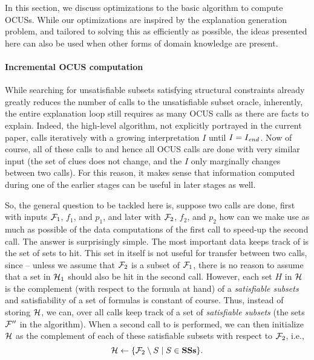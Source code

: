 In this section, we discuss optimizations to the basic algorithm to compute OCUSs. 
While our optimizations are inspired by the explanation generation problem, and tailored to solving this as efficiently as possible, the ideas presented here can also be used when other forms of domain knowledge are present.  


\paragraph{Incremental OCUS computation}
While searching for unsatisfiable subsets satisfying structural constraints already greatly reduces the number of calls to the unsatisfiable subset oracle, inherently, the entire explanation loop still requires as many OCUS calls as there are facts to explain. 
Indeed, the high-level algorithm, not explicitly portrayed in the current paper, calls \onestepo iteratively with a  growing  interpretation $I$ until $I=I_\mathit{end} $.
Now of course, all of these calls to \onestepo and hence all OCUS calls are done with very similar input (the set of clues does not change, and the $I$ only marginally changes between two calls). For this reason, it makes sense that information computed during one of the earlier stages can be useful in later stages as well. 

So, the general question to be tackled here is, suppose two \comus calls are done, first with inputs $\mathcal{F} _1$, $f_1$, and $p_1$, and later with $\mathcal{F} _2$, $f_2$, and $p_2$ how can we make use as much as possible of the data computations of the first call to speed-up the second call. The answer is surprisingly simple. The most important data \comus keeps track of  is the set \setstohit of sets to hit.  This set in itself is not useful for transfer between two calls, since -- unless we assume that $\mathcal{F} _2$ is a subset of $\mathcal{F} _1$, there is no reason to assume that a set in $\mathcal{H} _1$ should also be hit in the second call. 
However, each set $H$ in $\mathcal{H} $ is the complement (with respect to the formula at hand) of a \emph{satisfiable subsets} and satisfiability of a set of formulas is constant of course. 
Thus, instead of storing $\mathcal{H} $, we can, over all calls keep track of a set \satsets of \emph{satisfiable subsets} (the sets $\mathcal{F} ''$ in the \comus algorithm). 
When a second call to \comus is performed, we can then initialize $\mathcal{H} $ as the complement of each of these satisfiable subsets with respect to $\mathcal{F} _2$, i.e., \[\mathcal{H} \gets \{\mathcal{F} _2\setminus S\mid S\in \mathbf{SSs}\}.\]

